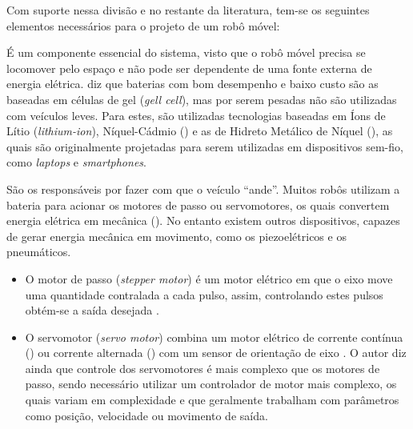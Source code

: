 Com suporte nessa divisão e no restante da literatura, tem-se os seguintes elementos necessários para o projeto de um robô móvel:


 É um componente essencial do sistema, visto que o robô móvel precisa se locomover pelo espaço e não pode 
ser dependente de uma fonte externa de energia elétrica.  diz que baterias com bom desempenho e baixo custo são 
as baseadas em células de gel (\textit{gell cell}), 
mas por serem pesadas não são utilizadas com veículos 
leves. Para estes, são utilizadas tecnologias baseadas em Íons de Lítio (\textit{lithium-ion}), 
Níquel-Cádmio () e as de Hidreto Metálico de Níquel (), as quais são 
originalmente projetadas para serem utilizadas em dispositivos sem-fio, como \textit{laptops} e \textit{smartphones}.

São os responsáveis por fazer com que o veículo \textquotedblleft ande\textquotedblright. 
Muitos robôs utilizam a bateria para acionar os motores de passo ou servomotores, os quais convertem energia 
elétrica em mecânica (). No entanto existem outros dispositivos, capazes de gerar energia mecânica em movimento, 
como os piezoelétricos e os pneumáticos.\par
\begin{itemize}
 \item O motor de passo (\textit{stepper motor}) é um motor elétrico em que o eixo move uma quantidade contralada a cada pulso, assim, 
controlando estes pulsos obtém-se a saída desejada \cite{dudek_mobile}.\par
 \item O servomotor (\textit{servo motor}) combina um motor elétrico de corrente contínua 
() ou corrente alternada () com um sensor de orientação de eixo 
\cite{dudek_mobile}. 
O autor diz ainda que controle dos servomotores é mais complexo que os motores de passo, sendo necessário utilizar um controlador de 
motor mais complexo, os quais variam em complexidade e que geralmente trabalham com parâmetros como posição, velocidade ou 
movimento de saída.
\end{itemize}




